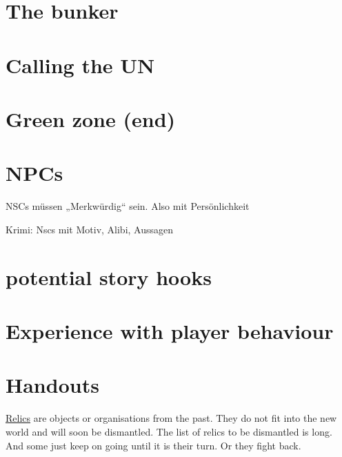 \section{The bunker}

\section{Calling the UN}

\section{Green zone (end)}


\section{NPCs}

NSCs müssen „Merkwürdig“ sein. Also mit Persönlichkeit

Krimi: Nscs mit Motiv, Alibi, Aussagen


\section{potential story hooks}

\section{Experience with player behaviour}

\section{Handouts}



\begin{sidebarBox}[title=Relics]
\hyperref[sec:Relic]{Relics} are objects or organisations from the past. They do not fit into the new world and will soon be dismantled. The list of relics to be dismantled is long. And some just keep on going until it is their turn. Or they fight back.
\end{sidebarBox}

